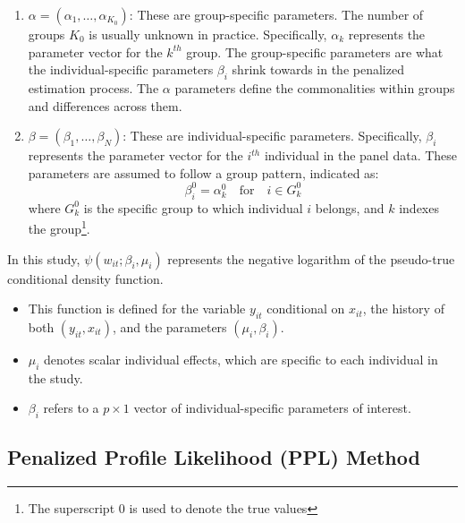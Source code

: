 \documentclass[UTF8,a4paper,10pt]{article}
\begin{document}
\begin{enumerate}[itemsep=0pt]

    \item \( \alpha = (\alpha_1,\ldots,\alpha_{K_0})\): These are group-specific parameters.     
    The number of groups \(K_0\) is usually unknown in practice.
     Specifically, \( \alpha_k \) represents the parameter vector for the \( k^{th} \) group. The group-specific parameters are what the individual-specific parameters \( \beta_i \) shrink towards in the penalized estimation process. The \( \alpha \) parameters define the commonalities within groups and differences across them.
    
    \item \( \beta = (\beta_1,\ldots,\beta_N) \): These are individual-specific parameters. Specifically, \( \beta_i \) represents the parameter vector for the \( i^{th} \) individual in the panel data. These parameters are assumed to follow a group pattern, indicated as:
    \[ 
    \beta^0_i = \alpha^0_k \quad \text{for} \quad i \in G^0_k 
    \]
    where \( G^0_k \) is the specific group to which individual \( i \) belongs, and \( k \) indexes the group\footnote{The superscript 0 is used to denote the true values}.

\end{enumerate}

In this study, \(\psi(w_{it}; \beta_i, \mu_i)\) represents the negative logarithm of the pseudo-true conditional density function.

\begin{itemize}[itemsep=0pt]
    \item This function is defined for the variable \(y_{it}\) conditional on \(x_{it}\), the history of both \((y_{it}, x_{it})\), and the parameters \((\mu_i,\beta_i)\).
    \item \(\mu_i\) denotes scalar individual effects, which are specific to each individual in the study.
    \item \(\beta_i\) refers to a \(p \times 1\) vector of individual-specific parameters of interest.
\end{itemize}



\subsection{Penalized Profile Likelihood (PPL) Method}
\end{document}
